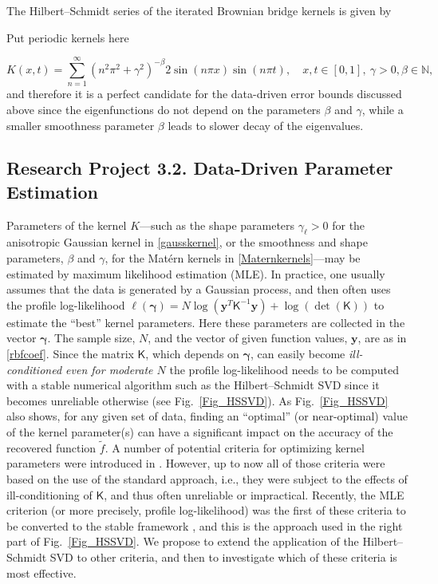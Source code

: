 \documentclass[11pt]{NSFamsart}
\newcommand{\tf}{\tilde{f}}
\newcommand{\mK}{\mathsf{K}}
\newcommand{\by}{{\boldsymbol{y}}}
\newcommand{\bgamma}{{\boldsymbol{\gamma}}}
\begin{document}
The Hilbert--Schmidt series of the iterated Brownian bridge kernels \citep{CavorettoEtAl14} is given by

Put periodic kernels here

\begin{equation}\label{IBBkernel}
K(x,t) = \sum_{n=1}^{\infty} \left(n^2\pi^2 + \gamma^2\right)^{-\beta} 2\sin(n\pi x) \sin(n\pi t), \quad x,t \in [0,1],\ \gamma>0, \beta \in \mathbb{N},
\end{equation}
and therefore it is a perfect candidate for the data-driven error bounds discussed above since the eigenfunctions do not depend on the parameters $\beta$ and $\gamma$, while a smaller smoothness parameter $\beta$ leads to slower decay of the eigenvalues.

\subsection*{Research Project 3.2. Data-Driven Parameter Estimation} \label{parestsubsec}
Parameters of the kernel $K$---such as the shape parameters $\gamma_\ell>0$ for the anisotropic Gaussian kernel in \eqref{gausskernel}, or the smoothness and shape parameters, $\beta$ and $\gamma$, for the Mat\'ern kernels in \eqref{Maternkernels}---may be estimated by maximum likelihood estimation (MLE).  In practice, one usually assumes that the data is generated by a Gaussian process, and then often uses the profile log-likelihood $\ell(\bgamma) = N\log(\by^T\mK^{-1}\by) + \log(\det(\mK))$ to estimate the ``best'' kernel parameters. Here these parameters are collected in the vector $\bgamma$.  The sample size, $N$, and the vector of given function values, $\by$, are as in \eqref{rbfcoef}. Since the matrix $\mK$, which depends on $\bgamma$, can easily become \emph{ill-conditioned even for moderate $N$} the profile log-likelihood needs to be computed with a stable numerical algorithm such as the Hilbert--Schmidt SVD since it becomes unreliable otherwise (see Fig.~\ref{Fig_HSSVD}).
As Fig.~\ref{Fig_HSSVD} also shows, for any given set of data, finding an ``optimal'' (or near-optimal) value of the kernel parameter(s) can have a significant impact on the accuracy of the recovered function $\tf$. A number of potential criteria for optimizing kernel parameters were introduced in \citep{Fasshauer11}. However, up to now all of those criteria were based on the use of the standard approach, i.e., they were subject to the effects of ill-conditioning of $\mK$, and thus often unreliable or impractical. Recently, the MLE criterion (or more precisely, profile log-likelihood) was the first of these criteria to be converted to the stable framework \citep{McCourtFas14}, and this is the approach used in the right part of Fig.~\ref{Fig_HSSVD}. We propose to extend the application of the Hilbert--Schmidt SVD to other criteria, and then to investigate which of these criteria is most effective.
\end{document}
